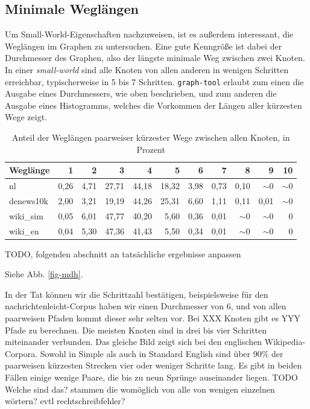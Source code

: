 \documentclass[11pt, a4paper]{article}
\begin{document}
\subsection{Minimale Wegl\"angen}
Um Small-World-Eigenschaften nachzuweisen, ist es außerdem interessant, die
Weglängen im Graphen zu untersuchen. Eine gute Kenngröße ist dabei der Durchmesser
des Graphen, also der längste minimale Weg zwischen zwei Knoten. In einer
\emph{small-world} sind alle Knoten von allen anderen in wenigen Schritten
erreichbar, typischerweise in 5 bis 7 Schritten. \texttt{graph-tool}
erlaubt zum einen die Ausgabe eines Durchmessers, wie oben beschrieben, und zum
anderen die Ausgabe eines Histogramms, welches die Vorkommen der Längen aller
kürzesten Wege zeigt.

\begin{table}[h]
  \centering
  \begin{tabular}{l*{10}{r}}
    \toprule
    Weglänge    & 1    & 2    & 3     & 4     & 5     & 6    & 7    & 8        & 9        & 10      \\
    \midrule
    nl          & 0,26 & 4,71 & 27,71 & 44,18 & 18,32 & 3,98 & 0,73 & 0,10     & $\sim$0  & $\sim$0 \\
    denews10k   & 2,00 & 3,21 & 19,19 & 44,26 & 25,31 & 6,60 & 1,11 & 0,11     & 0,01     & $\sim$0 \\
    wiki\_sim   & 0,05 & 6,01 & 47,77 & 40,20 & 5,60  & 0,36 & 0,01 & $\sim$0  & $\sim$0  & 0       \\
    wiki\_en    & 0,04 & 5,30 & 47,36 & 41,43 & 5,50  & 0,34 & 0,01 & $\sim$0  & $\sim$0  & 0       \\
  \bottomrule
  \end{tabular}
  \caption{Anteil der Weglängen paarweiser kürzester Wege zwischen allen Knoten, in Prozent}
\end{table}

TODO, folgenden abschnitt an tatsächliche ergebnisse anpassen 

Siehe Abb. \ref{fig-mdh}.

In der Tat können wir die Schrittzahl bestätigen, beispielsweise für den
nachrichtenleicht-Corpus haben wir einen Durchmesser von 6, und von
allen paarweisen Pfaden kommt dieser sehr selten vor. Bei XXX Knoten gibt
es YYY Pfade zu berechnen. Die meisten Knoten sind in drei bis vier Schritten
miteinander verbunden.
Das gleiche Bild zeigt sich bei den englischen Wikipedia-Corpora. Sowohl in 
Simple als auch in Standard English sind über 90\% der paarweisen
kürzesten Strecken vier oder weniger Schritte lang. Es gibt in beiden Fällen 
einige wenige Paare, die bis zu neun Sprünge auseinander liegen.
TODO Welche sind das? stammen die womöglich von alle von wenigen einzelnen wörtern? evtl rechtschreibfehler? 
\end{document}
